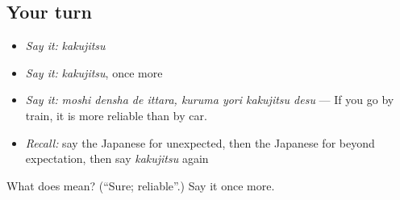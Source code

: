 \subsection*{Your turn}
\begin{itemize}
\raggedright
  \item \emph{Say it:} \emph{kakujitsu}
  \item \emph{Say it:} \emph{kakujitsu}, once more
  \item \emph{Say it:} \emph{moshi densha de ittara, kuruma yori kakujitsu desu} — If you go by train, it is more reliable than by car.
  \item \emph{Recall:} say the Japanese for unexpected, then the Japanese for beyond expectation, then say \emph{kakujitsu} again
\end{itemize}

\begin{tcolorbox}[breakable,colback=teal!4,colframe=teal!35!black,title={Before you move on}]
What does  mean? (\textquotedblleft{}Sure; reliable\textquotedblright{}.) Say it once more.
\end{tcolorbox}

